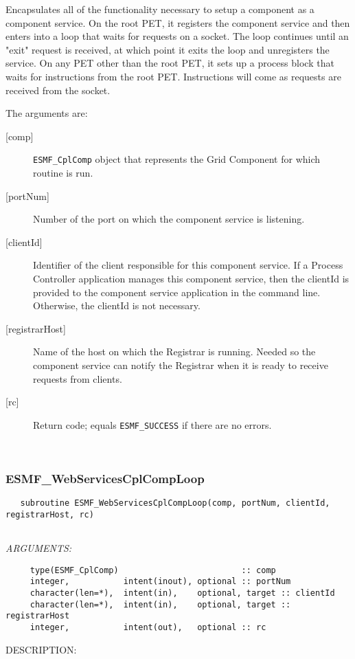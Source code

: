      Encapsulates all of the functionality necessary to setup a component as
     a component service.  On the root PET, it registers the
     component service and then enters into a loop that waits for requests on 
     a socket.  The loop continues until an "exit" request is received, at 
     which point it exits the loop and unregisters the service.  On
     any PET other than the root PET, it sets up a process block that waits
     for instructions from the root PET.  Instructions will come as requests
     are received from the socket.
  
   The arguments are:
   \begin{description}
   \item[{[comp]}]
     {\tt ESMF\_CplComp} object that represents the Grid Component for which
     routine is run.
   \item[{[portNum]}]
     Number of the port on which the component service is listening.
   \item[{[clientId]}]
     Identifier of the client responsible for this component service.  If a
     Process Controller application manages this component service, then the
     clientId is provided to the component service application in the command
     line.  Otherwise, the clientId is not necessary.
   \item[{[registrarHost]}]
     Name of the host on which the Registrar is running.  Needed so the
     component service can notify the Registrar when it is ready to receive
     requests from clients.
   \item[{[rc]}]
     Return code; equals {\tt ESMF\_SUCCESS} if there are no errors.
   \end{description}
   
 
\mbox{}\hrulefill\ 
 
\subsubsection [ESMF\_WebServicesCplCompLoop] {ESMF\_WebServicesCplCompLoop }


  
\begin{verbatim}   subroutine ESMF_WebServicesCplCompLoop(comp, portNum, clientId, registrarHost, rc)
 
 \end{verbatim}{\em ARGUMENTS:}
\begin{verbatim}     type(ESMF_CplComp)                         :: comp
     integer,           intent(inout), optional :: portNum
     character(len=*),  intent(in),    optional, target :: clientId
     character(len=*),  intent(in),    optional, target :: registrarHost
     integer,           intent(out),   optional :: rc\end{verbatim}
{\sf DESCRIPTION:\\ }


